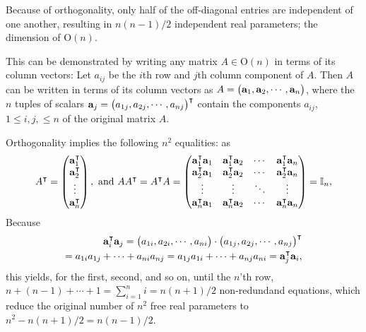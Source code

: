 
Because of orthogonality, only half of the off-diagonal entries are independent of one another,
resulting in $n(n-1)/2$ independent real parameters; the dimension of $ \textrm{O}(n)$.

{\color{OliveGreen}
\bproof
This can be demonstrated by writing any matrix $A \in \textrm{O}(n)$ in terms of its column vectors:
Let $a_{ij}$ be the $i$th row and $j$th column component of $A$.
Then $A$ can be written in terms of its column vectors as
$A=\begin{pmatrix}
{\bf a}_1,
{\bf a}_2,
\cdots ,
{\bf a}_n
\end{pmatrix}$,
where the $n$ tuples of scalars ${\bf a}_j = \begin{pmatrix}
{a}_{1j},
{a}_{2j},
\cdots ,
{a}_{nj}
\end{pmatrix}^\intercal $
contain the components $a_{ij}$, $ 1 \le i,j, \le n$ of the original matrix  $A$.

Orthogonality implies the following $n^2$ equalities: as
\begin{equation}
A^\intercal  =\begin{pmatrix}
{\bf a}_1^\intercal \\
{\bf a}_2^\intercal \\
\vdots \\
{\bf a}_n^\intercal
\end{pmatrix},
\text { and }
%
AA^\intercal =A^\intercal  A=
\begin{pmatrix}
{\bf a}_1^\intercal {\bf a}_1 & {\bf a}_1^\intercal {\bf a}_2  &\cdots & {\bf a}_1^\intercal {\bf a}_n  \\
{\bf a}_2^\intercal {\bf a}_1 & {\bf a}_2^\intercal {\bf a}_2  &\cdots & {\bf a}_2^\intercal {\bf a}_n  \\
\vdots   & \vdots &\ddots & \vdots  \\
{\bf a}_n^\intercal  {\bf a}_1& {\bf a}_n^\intercal {\bf a}_2  &\cdots & {\bf a}_n^\intercal {\bf a}_n  \\
\end{pmatrix}
={\Bbb I}_n,
\end{equation}
Because
\begin{equation}
\begin{split}
{\bf a}_i^\intercal {\bf a}_j =
\begin{pmatrix}
{a}_{1i},
{a}_{2i},
\cdots ,
{a}_{ni}
\end{pmatrix}
\cdot
\begin{pmatrix}
{a}_{1j},
{a}_{2j},
\cdots ,
{a}_{nj}
\end{pmatrix}^\intercal
\\
=
{a}_{1i}  {a}_{1j} +
\cdots +
{a}_{ni}  {a}_{nj}
=
{a}_{1j} {a}_{1i}  +
\cdots +
 {a}_{nj} {a}_{ni} =
{\bf a}_j^\intercal {\bf a}_i,
\end{split}
\end{equation}
this yields, for the first, second, and so on, until the $n$'th row,
$n + (n-1) +  \cdots +1= \sum_{i=1}^{n} i= n(n+1)/2$ non-redundand equations, which reduce the original number of $n^2$ free real parameters to
$n^2 - n(n+1)/2 = n(n-1)/2$.
\eproof
}

